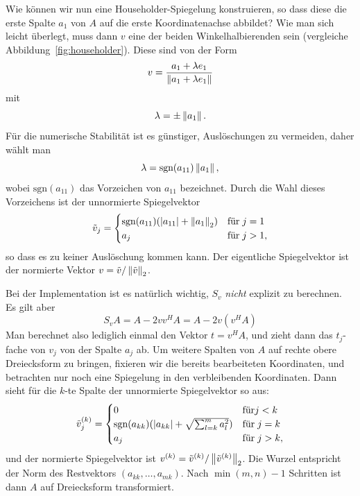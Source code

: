 Wie können wir nun eine Householder-Spiegelung konstruieren, so dass
diese die erste Spalte $a_1$ von $A$ auf die erste Koordinatenachse
abbildet? Wie man sich leicht überlegt, muss dann $v$ eine der beiden
Winkelhalbierenden sein (vergleiche
Abbildung~\ref{fig:householder}). Diese sind von der Form
\begin{equation}
  v = \frac{a_1 + \lambda e_1}{\left\lVert{a_1 +\lambda e_1}\right\rVert}
\end{equation}
mit
\begin{equation}
  \lambda = \pm\left\lVert{a_1}\right\rVert.
\end{equation}
Für die numerische Stabilität ist es günstiger, Auslöschungen zu
vermeiden, daher wählt man
\begin{equation}
  \lambda = \text{sgn}(a_{11}) \left\lVert{a_1}\right\rVert,
\end{equation}
wobei $\text{sgn}(a_{11})$ das Vorzeichen von $a_{11}$ bezeichnet.
Durch die Wahl dieses Vorzeichens ist der unnormierte Spiegelvektor
\begin{equation}
  \tilde{v}_j = \begin{cases}
    \text{sgn}(a_{11})(\left\lvert{a_{11}}\right\rvert + \left\lVert{a_1}\right\rVert_2) & \text{für}\; j=1\\
    a_j & \text{für}\; j>1,
  \end{cases}
\end{equation}
so dass es zu keiner Auslöschung kommen kann. Der eigentliche
Spiegelvektor ist der normierte Vektor $v =
\tilde{v}/\left\lVert{\tilde{v}}\right\rVert_2$.

Bei der Implementation ist es natürlich wichtig, $S_v$ \emph{nicht}
explizit zu berechnen. Es gilt aber
\begin{equation}
  \label{eq:hhupdate}
  S_vA = A - 2v v^HA = A - 2 v (v^HA)
\end{equation}
Man berechnet also lediglich einmal den Vektor $t = v^HA$, und zieht
dann das $t_j$-fache von $v_j$ von der Spalte $a_j$ ab. Um weitere
Spalten von $A$ auf rechte obere Dreiecksform zu bringen, fixieren wir
die bereits bearbeiteten Koordinaten, und betrachten nur noch eine
Spiegelung in den verbleibenden Koordinaten. Dann sieht für die $k$-te
Spalte der unnormierte Spiegelvektor so aus:
\begin{equation}
  \tilde{v}^{(k)}_j = \begin{cases}
    0 & \text{für} j < k\\
    \text{sgn}(a_{kk})(\left\lvert{a_{kk}}\right\rvert + \sqrt{\sum_{l = k}^m a_l^2}) & \text{für}\; j=k\\
    a_j & \text{für}\; j>k,
  \end{cases}
\end{equation}
und der normierte Spiegelvektor ist $v^{(k)} =
\tilde{v}^{(k)}/\left\lVert{\tilde{v}^{(k)}}\right\rVert_2$. Die Wurzel entspricht der
Norm des Restvektors $(a_{kk},\ldots,a_{mk})$. Nach $\min(m,n)-1$
Schritten ist dann $A$ auf Dreiecksform transformiert.

